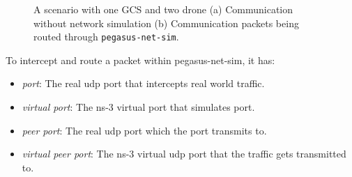 \begin{figure} 
	\centering
	\caption[Example of \texttt{pegasus-net-sim} intercepting packets.]{\small 
		A scenario with one GCS and two drone (a) Communication without network simulation (b) Communication packets being routed through \texttt{pegasus-net-sim}.}
	
	\label{fig:pegasus-net-sim-simulation-example}
\end{figure}

To intercept and route a packet within pegasus-net-sim, it has:
\begin{itemize}
	\item \textit{port}: The real udp port that intercepts real world traffic.
	\item \textit{virtual port}: The ns-3 virtual port that simulates port.
	\item \textit{peer port}: The real udp port which the port transmits to.
	\item \textit{virtual peer port}: The ns-3 virtual udp port that the traffic gets transmitted to.
\end{itemize}


